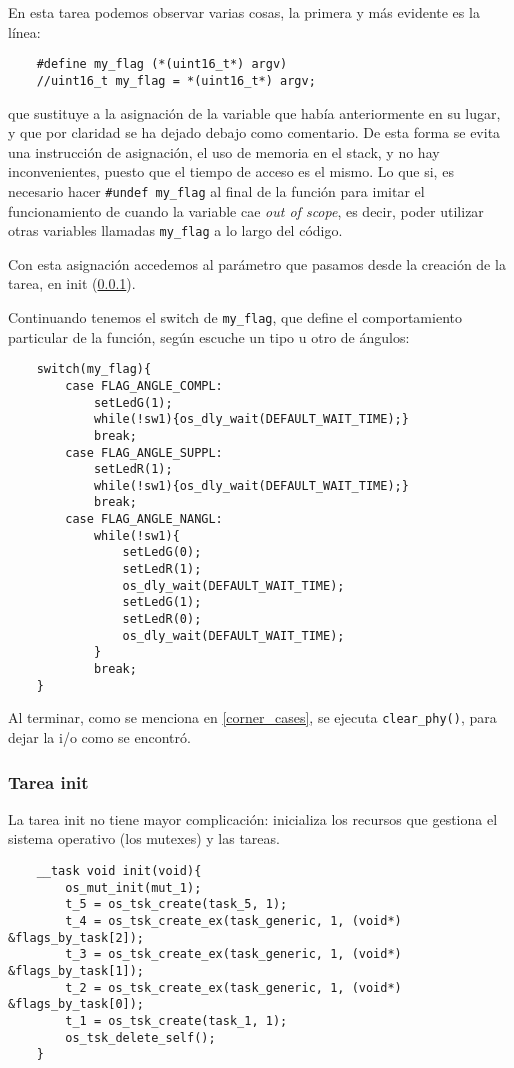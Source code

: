 \documentclass[a4paper,openright,12pt]{article}
\begin{document}
En esta tarea podemos observar varias cosas, la primera y más evidente es la línea:
\begin{verbatim}
    #define my_flag (*(uint16_t*) argv)
    //uint16_t my_flag = *(uint16_t*) argv;
\end{verbatim}
que sustituye a la asignación de la variable que había anteriormente en su lugar, y que por claridad se ha dejado debajo como comentario. De esta forma se evita una instrucción de
asignación, el uso de memoria en el stack, y no hay inconvenientes, puesto que el tiempo de acceso es el mismo. Lo que si, es necesario hacer \texttt{\#undef my\_flag} al final de la
función para imitar el funcionamiento de cuando la variable cae \emph{out of scope}, es decir, poder utilizar otras variables llamadas \texttt{my\_flag} a lo largo del código. 

Con esta asignación accedemos al parámetro que pasamos desde la creación de la tarea, en init (\ref{task_init}).

\bigskip

Continuando tenemos el switch de \texttt{my\_flag}, que define el comportamiento particular de la función, según escuche un tipo u otro de ángulos:
\begin{verbatim}
    switch(my_flag){
        case FLAG_ANGLE_COMPL:
            setLedG(1);
            while(!sw1){os_dly_wait(DEFAULT_WAIT_TIME);}
            break;
        case FLAG_ANGLE_SUPPL:
            setLedR(1);
            while(!sw1){os_dly_wait(DEFAULT_WAIT_TIME);}
            break;
        case FLAG_ANGLE_NANGL:
            while(!sw1){
                setLedG(0);
                setLedR(1);
                os_dly_wait(DEFAULT_WAIT_TIME);
                setLedG(1);
                setLedR(0);
                os_dly_wait(DEFAULT_WAIT_TIME);
            }
            break;
    }
\end{verbatim}

Al terminar, como se menciona en \ref{corner_cases}, se ejecuta \texttt{clear\_phy()}, para dejar la i/o como se encontró.

\subsubsection{Tarea init}\label{task_init}
La tarea init no tiene mayor complicación: inicializa los recursos que gestiona el sistema operativo (los mutexes) y las tareas.
\begin{verbatim}
    __task void init(void){
        os_mut_init(mut_1);
        t_5 = os_tsk_create(task_5, 1);
        t_4 = os_tsk_create_ex(task_generic, 1, (void*) &flags_by_task[2]);
        t_3 = os_tsk_create_ex(task_generic, 1, (void*) &flags_by_task[1]);
        t_2 = os_tsk_create_ex(task_generic, 1, (void*) &flags_by_task[0]);
        t_1 = os_tsk_create(task_1, 1);
        os_tsk_delete_self();
    }
\end{verbatim}
\end{document}
